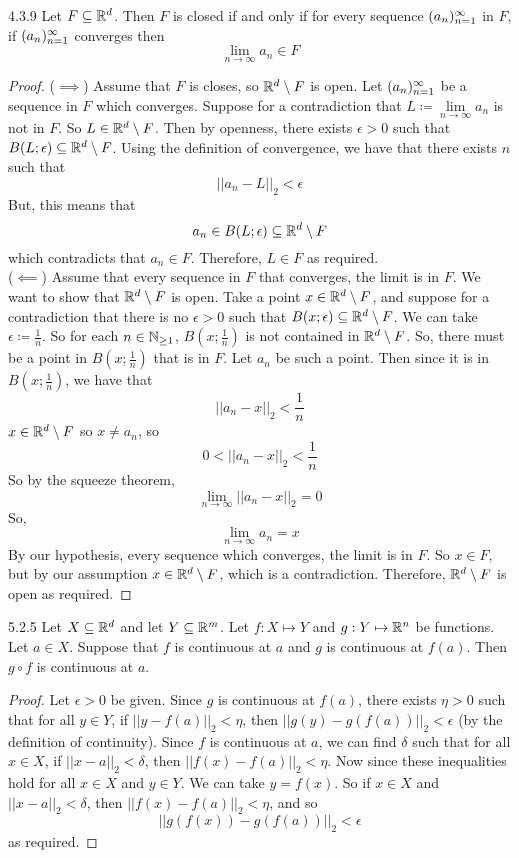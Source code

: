 \documentclass[openany]{report}
\begin{document}
\begin{manualprop}{4.3.9}
    Let $F \subseteq \mathbb{R}^d$. Then $F$ is closed if and only if for every sequence $({a}_n)_{n=1}^\infty$ in $F$, if $({a}_n)_{n=1}^\infty$ converges then 
    \[\lim_{n\rightarrow\infty} a_n \in F\]
\end{manualprop}
\begin{proof}
    ($\implies$) Assume that $F$ is closes, so $\mathbb{R}^d \setminus F$ is open. Let $({a}_n)_{n=1}^\infty$ be a sequence in $F$ which converges. Suppose for a contradiction that $L \coloneqq \lim\limits_{n\rightarrow\infty} a_n$ is not in $F$. So $L \in \mathbb{R}^d \setminus F$. Then by openness, there exists $\epsilon > 0$ such that $B(L; \epsilon) \subseteq \mathbb{R}^d \setminus F$. Using the definition of convergence, we have that there exists $n$ such that 
    \[||a_n - L||_2 < \epsilon\]
    But, this means that 
    \[a_n \in B(L;\epsilon) \subseteq \mathbb{R}^d \setminus F\]
    which contradicts that $a_n \in F$. Therefore, $L \in F$ as required.\\[1ex]
    ($\impliedby$) Assume that every sequence in $F$ that converges, the limit is in $F$. We want to show that $\mathbb{R}^d \setminus F$ is open. Take a point $x \in \mathbb{R}^d \setminus F$, and suppose for a contradiction that there is no $\epsilon > 0$ such that $B(x; \epsilon) \subseteq \mathbb{R}^d \setminus F$. We can take $\epsilon \coloneqq \frac{1}{n}$. So for each $n \in \mathbb{N}_{\geq 1}$, $B(x;\frac{1}{n})$ is not contained in $\mathbb{R}^d \setminus F$. So, there must be a point in $B(x;\frac{1}{n})$ that is in $F$. Let $a_n$ be such a point. Then since it is in $B(x;\frac{1}{n})$, we have that
    \[||a_n-x||_2 < \frac{1}{n}\]
    $x \in \mathbb{R}^d \setminus F$ so $x \neq a_n$, so 
    \[0 < ||a_n-x||_2 < \frac{1}{n}\]
    So by the squeeze theorem,
    \[\lim_{n\rightarrow\infty} ||a_n-x||_2 = 0\]
    So, 
    \[\lim_{n \rightarrow \infty} a_n = x\]
    By our hypothesis, every sequence which converges, the limit is in $F$. So $x \in F$, but by our assumption $x \in \mathbb{R}^d \setminus F$, which is a contradiction. Therefore, $\mathbb{R}^d \setminus F$ is open as required.
\end{proof}

\begin{manualprop}{5.2.5}
    Let $X \subseteq \mathbb{R}^d$ and let $Y \subseteq \mathbb{R}^m$. Let $f : X \mapsto Y$ and $g : Y \mapsto \mathbb{R}^n$ be functions. Let $a \in X$. Suppose that $f$ is continuous at $a$ and $g$ is continuous at $f(a)$. Then $g \circ f$ is continuous at $a$.
\end{manualprop}
\begin{proof}
    Let $\epsilon > 0$ be given. Since $g$ is continuous at $f(a)$, there exists $\eta > 0$ such that for all $y \in Y$, if $||y - f(a)||_2 < \eta$, then $||g(y) - g(f(a))||_2 < \epsilon$ (by the definition of continuity). Since $f$ is continuous at $a$, we can find $\delta$ such that for all $x \in X$, if $||x-a||_2 < \delta$, then $||f(x) - f(a)||_2 < \eta$. Now since these inequalities hold for all $x \in X$ and $y \in Y$. We can take $y = f(x)$. So if $x \in X$ and $||x-a||_2 < \delta$, then $||f(x) - f(a)||_2 < \eta$, and so 
    \[||g(f(x)) - g(f(a))||_2 < \epsilon\]
    as required.
\end{proof}
    
\end{document}
